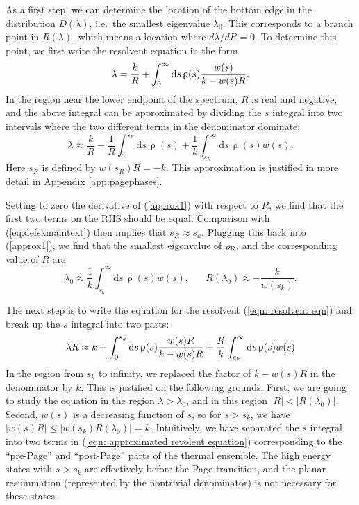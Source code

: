 \documentclass[11pt]{article}
\newcommand{\be}{\begin{equation}}
\newcommand{\ee}{\end{equation}}
\numberwithin{equation}{section}
\begin{document}
As a first step, we can determine the location of the bottom edge in the distribution $D(\lambda)$, i.e.~the smallest eigenvalue $\lambda_0$. This corresponds to a branch point in $R(\lambda)$, which means a location where $d\lambda/dR = 0$. To determine this point, we first write the resolvent equation in the form
\be
\lambda={k\over R}+\int_0^\infty \mathrm{d}s\,\uprho(s){w(s)\over k-w(s)R}.
\label{eqn:lambda(R)}
\ee
In the region near the lower endpoint of the spectrum, $R$ is real and negative, and the above integral can be approximated by dividing the $s$ integral into two intervals where the two different terms in the denominator dominate:
\be
\lambda \approx \frac{k}{R}-\frac{1}{R}\int_0^{s_R}\mathrm{d}s\,\uprho(s) + \frac{1}{k}\int_{s_R}^\infty \mathrm{d}s\,\uprho(s)w(s).\label{approx1}
\ee 
Here $s_R$ is defined by $w(s_R)R = -k$. This approximation is justified in more detail in Appendix \ref{app:pagephases}.

Setting to zero the derivative of (\ref{approx1}) with respect to $R$, we find that the first two terms on the RHS should be equal. Comparison with (\ref{eq:defskmaintext}) then implies that $s_R\approx s_k$. Plugging this back into (\ref{approx1}), we find that the smallest eigenvalue of $\rho_{\sf{R}}$, and the corresponding value of $R$ are
\be
\lambda_0 \approx \frac{1}{k}\int_{s_k}^\infty \mathrm{d}s\,\uprho(s) w(s),  \hspace{20pt} R(\lambda_0) \approx -\frac{k }{w(s_k)}.\label{lambda0}
\ee

The next step is to write the equation for the resolvent (\ref{eqn: resolvent eqn}) and break up the $s$ integral into two parts:
\be
\lambda R\approx k+\int_0^{s_k} \mathrm{d}s\,\uprho(s){w(s)R\over k -w(s) R}+\frac{R}{k}\int_{s_k}^{\infty}\mathrm{d}s\,\uprho(s)w(s)%
\label{eqn: approximated revolent equation}
\ee
In the region from $s_k$ to infinity, we replaced the factor of $k-w(s)R$ in the denominator by $k$. This is justified on the following grounds. First, we are going to study the equation in the region $\lambda > \lambda_0$, and in this region $|R| < |R(\lambda_0)|$. Second, $w(s)$ is a decreasing function of $s$, so for $s > s_k$, we have $|w(s)R| \le |w(s_k) R(\lambda_0)| = k$. Intuitively, we have separated the $s$ integral into two terms in (\ref{eqn: approximated revolent equation}) corresponding to the ``pre-Page'' and ``post-Page'' parts of the thermal ensemble. The high energy states with $s > s_k$ are effectively before the Page transition, and the planar resummation (represented by the nontrivial denominator) is not necessary for these states. 
\end{document}
